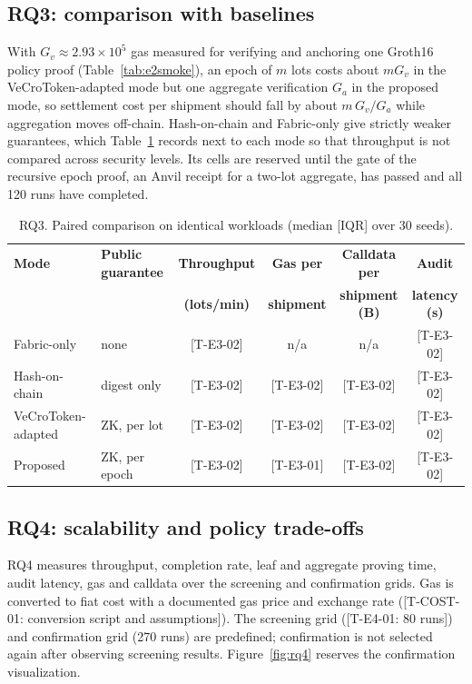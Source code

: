 \documentclass[runningheads]{llncs}
\newif\iffinal
\newcommand{\pending}[2]{\iffinal\errmessage{Unresolved pending result #1}\else{\color{red}[#1: #2]}\fi}
\newif\ifmarkrev
\newcommand{\rev}[1]{\ifmarkrev{\color{blue}#1}\else#1\fi}
\newcommand{\pendcell}[1]{\iffinal\errmessage{Unresolved pending result #1}\else{\color{red}[#1]}\fi}
\newcommand{\hd}[1]{{\bfseries\boldmath #1}}
\begin{document}
\subsection{RQ3: comparison with baselines}
With $G_v\approx2.93\times10^5$ gas measured for verifying and anchoring one Groth16 policy proof (Table~\ref{tab:e2smoke}), an epoch of $m$ lots costs about $mG_v$ in the VeCroToken-adapted mode but one aggregate verification $G_a$ in the proposed mode, so settlement cost per shipment should fall by about $m\,G_v/G_a$ while aggregation moves off-chain. Hash-on-chain and Fabric-only give strictly weaker guarantees, \rev{which Table~\ref{tab:rq3} records next to each mode so that throughput is not compared across security levels}. Its cells are reserved until the gate of the recursive epoch proof, an Anvil receipt for a two-lot aggregate, has passed and all 120 runs have completed.

\begin{table}[t]
\centering
\caption{RQ3. Paired comparison on identical workloads (median [IQR] over 30 seeds).}
\label{tab:rq3}
\scriptsize
\setlength{\tabcolsep}{2.4pt}
\begin{tabular}{@{}llcccc@{}}
\toprule
\hd{Mode} & \hd{\rev{Public guarantee}} & \hd{Throughput} & \hd{Gas per} & \hd{Calldata per} & \hd{Audit} \\
 & & \hd{(lots/min)} & \hd{shipment} & \hd{shipment (B)} & \hd{latency (s)} \\
\midrule
Fabric-only & \rev{none} & \pendcell{T-E3-02} & n/a & n/a & \pendcell{T-E3-02} \\
Hash-on-chain & \rev{digest only} & \pendcell{T-E3-02} & \pendcell{T-E3-02} & \pendcell{T-E3-02} & \pendcell{T-E3-02} \\
VeCroToken-adapted & \rev{ZK, per lot} & \pendcell{T-E3-02} & \pendcell{T-E3-02} & \pendcell{T-E3-02} & \pendcell{T-E3-02} \\
Proposed & \rev{ZK, per epoch} & \pendcell{T-E3-02} & \pendcell{T-E3-01} & \pendcell{T-E3-02} & \pendcell{T-E3-02} \\
\bottomrule
\end{tabular}
\end{table}

\subsection{RQ4: scalability and policy trade-offs}
RQ4 measures throughput, completion rate, leaf and aggregate proving time, audit latency, gas and calldata over the screening and confirmation grids. Gas is converted to fiat cost with a documented gas price and exchange rate (\pending{T-COST-01}{conversion script and assumptions}). The screening grid (\pending{T-E4-01}{80 runs}) and confirmation grid (270 runs) are predefined; confirmation is not selected again after observing screening results. Figure~\ref{fig:rq4} reserves the confirmation visualization.
\end{document}
